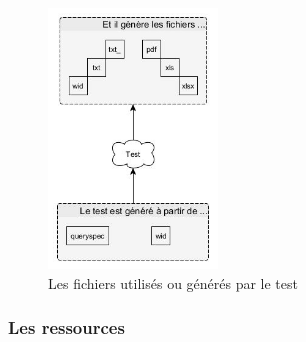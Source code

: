 \begin{figure}[H]
  \centering
      \includegraphics[width=0.4\textwidth]{images/usedFilesForTests.jpg}
  \caption{Les fichiers utilis\'{e}s ou g\'{e}n\'{e}r\'{e}s par le test}
	\label{figure:usedFilesForTests}
\end{figure}

\subsubsection{Les ressources}

